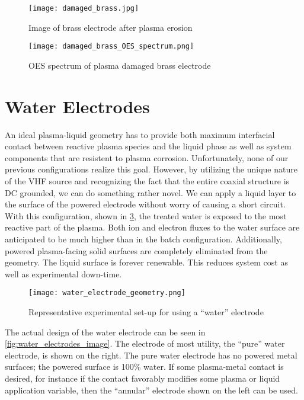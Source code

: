 \begin{figure}[htbp]
  \centering
  \texttt{[image: damaged\_brass.jpg]}
  \caption{Image of brass electrode after plasma erosion}
  \label{fig:brass_damage_full}
\end{figure}

\begin{figure}[htbp]
  \centering
  \texttt{[image: damaged\_brass\_OES\_spectrum.png]}
  \caption{OES spectrum of plasma damaged brass electrode}
  \label{fig:OES_brass_damage}
\end{figure}

\section{Water Electrodes}
\label{sec:water_electrodes}

An ideal plasma-liquid geometry has to provide both maximum interfacial contact between reactive plasma species and the liquid phase as well as system components that are resistent to plasma corrosion. Unfortunately, none of our previous configurations realize this goal. However, by utilizing the unique nature of the VHF source and recognizing the fact that the entire coaxial structure is DC grounded, we can do something rather novel. We can apply a liquid layer to the surface of the powered electrode without worry of causing a short circuit. With this configuration, shown in \cref{fig:water_electrode_scheme}, the treated water is exposed to the most reactive part of the plasma. Both ion and electron fluxes to the water surface are anticipated to be much higher than in the batch configuration. Additionally, powered plasma-facing solid surfaces are completely eliminated from the geometry. The liquid surface is forever renewable. This reduces system cost as well as experimental down-time.

\begin{figure}[htbp]
  \centering
  \texttt{[image: water\_electrode\_geometry.png]}
  \caption{Representative experimental set-up for using a ``water'' electrode}
  \label{fig:water_electrode_scheme}
\end{figure}

The actual design of the water electrode can be seen in \cref{fig:water_electrodes_image}. The electrode of most utility, the ``pure'' water electrode, is shown on the right. The pure water electrode has no powered metal surfaces; the powered surface is 100\% water. If some plasma-metal contact is desired, for instance if the contact favorably modifies some plasma or liquid application variable, then the ``annular'' electrode shown on the left can be used.

